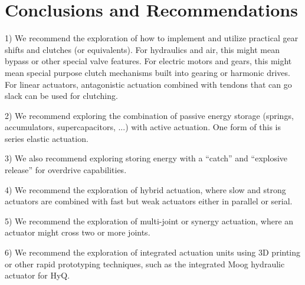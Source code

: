 \documentclass[letterpaper,12pt,fullpage]{article}
\begin{document}
\section{Conclusions and Recommendations}

1) We recommend the exploration of how to implement and utilize practical
gear shifts and clutches (or equivalents). For hydraulics and air, this might mean
bypass or other special valve features.
For electric motors and gears, this might mean special purpose clutch mechanisms
built into gearing or harmonic drives. For linear actuators, antagonistic actuation
combined with tendons that can go slack can be used for clutching.

2) We recommend exploring the combination of passive energy storage (springs,
accumulators, supercapacitors, ...) with active actuation. One form of this
is series elastic actuation. 

3) We also recommend exploring storing energy with
a ``catch'' and ``explosive release'' for overdrive capabilities. 

4) We recommend the exploration of hybrid actuation, where slow and strong actuators
are combined with fast but weak actuators either in parallel or serial.

5) We recommend the exploration of multi-joint or synergy actuation, where an actuator
might cross two or more joints.

6) We recommend the exploration of integrated actuation units using 3D printing
or other rapid prototyping techniques, such as the integrated Moog hydraulic
actuator for HyQ.
\end{document}
